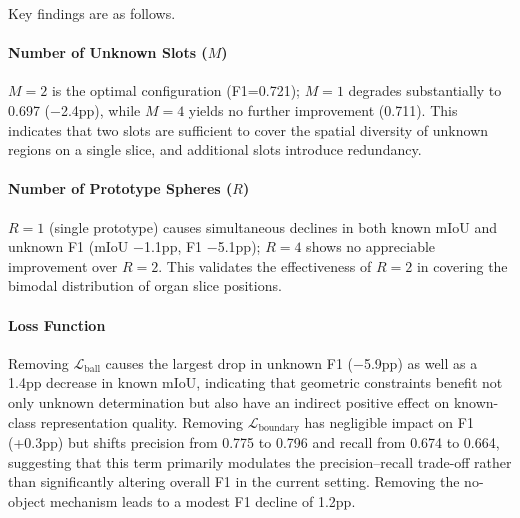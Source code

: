 \documentclass[journal]{IEEEtai}
\begin{document}
\begin{table}[t]
\centering
\footnotesize
\setlength{\tabcolsep}{4pt}
\caption{Structural ablation on Synapse A1. Baseline is the default configuration
($M=2, R=2$, full loss, no-object mechanism enabled). Each row modifies one variable.}\label{tab:ablation}
\end{table}

Key findings are as follows.

\paragraph{Number of Unknown Slots (\texorpdfstring{$M$}{M})}
$M=2$ is the optimal configuration (F1=0.721); $M=1$ degrades substantially to 0.697
($-$2.4pp), while $M=4$ yields no further improvement (0.711).
This indicates that two slots are sufficient to cover the spatial diversity of unknown
regions on a single slice, and additional slots introduce redundancy.

\paragraph{Number of Prototype Spheres (\texorpdfstring{$R$}{R})}
$R=1$ (single prototype) causes simultaneous declines in both known mIoU and unknown F1
(mIoU $-$1.1pp, F1 $-$5.1pp); $R=4$ shows no appreciable improvement over $R=2$.
This validates the effectiveness of $R=2$ in covering the bimodal distribution of organ
slice positions.

\paragraph{Loss Function}
Removing $\mathcal{L}_{\text{ball}}$ causes the largest drop in unknown F1 ($-$5.9pp)
as well as a 1.4pp decrease in known mIoU, indicating that geometric constraints
benefit not only unknown determination but also have an indirect positive effect on
known-class representation quality.
Removing $\mathcal{L}_{\text{boundary}}$ has negligible impact on F1 (+0.3pp) but
shifts precision from 0.775 to 0.796 and recall from 0.674 to 0.664, suggesting
that this term primarily modulates the precision--recall trade-off rather than
significantly altering overall F1 in the current setting.
Removing the no-object mechanism leads to a modest F1 decline of 1.2pp.
\end{document}
